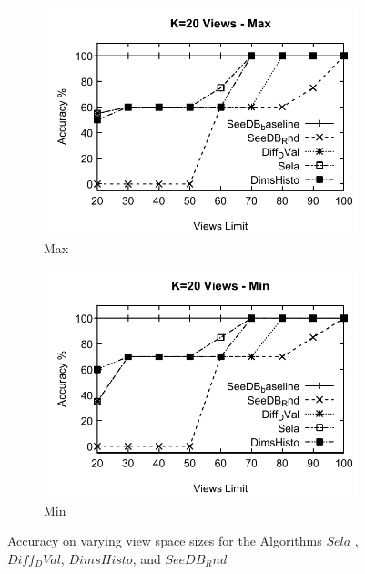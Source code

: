   \begin{figure}[h]
  \centering
  \begin{subfigure}[b]{0.42\textwidth}
    \includegraphics[width=\textwidth]{MaxA2.pdf}
    \caption{Max}
        \label{fig:MaxA2}%
  \end{subfigure}
  \begin{subfigure}[b]{0.42\textwidth}
    \includegraphics[width=\textwidth]{MinA2.pdf}
     \caption{Min}
        \label{fig:MinA2}
  \end{subfigure}
  \caption{Accuracy on varying view space sizes for the Algorithms $Sela$ ,$Diff_DVal$, $DimsHisto$, and $SeeDB_Rnd$}
\end{figure}

